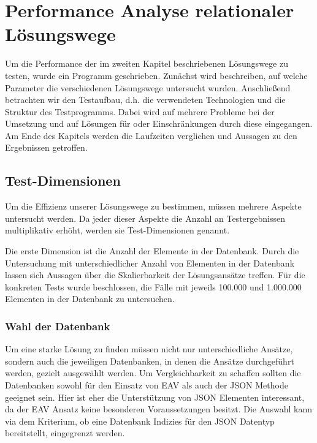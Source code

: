 \chapter{Performance Analyse relationaler Lösungswege}

Um die Performance der im zweiten Kapitel beschriebenen Lösungswege zu testen, wurde ein Programm geschrieben. Zunächst wird beschreiben, auf welche Parameter die verschiedenen Lösungswege untersucht wurden. Anschließend betrachten wir den Testaufbau, d.h. die verwendeten Technologien und die Struktur des Testprogramms. Dabei wird auf mehrere Probleme bei der Umsetzung und auf Lösungen für oder Einschränkungen durch diese eingegangen. Am Ende des Kapitels werden die Laufzeiten verglichen und Aussagen zu den Ergebnissen getroffen.

\section{Test-Dimensionen}

Um die Effizienz unserer Lösungswege zu bestimmen, müssen mehrere Aspekte untersucht werden. Da jeder dieser Aspekte die Anzahl an Testergebnissen multiplikativ erhöht, werden sie Test-Dimensionen genannt.

Die erste Dimension ist die Anzahl der Elemente in der Datenbank. Durch die Untersuchung mit unterschiedlicher Anzahl von Elementen in der Datenbank lassen sich Aussagen über die Skalierbarkeit der Lösungsansätze treffen. Für die konkreten Tests wurde beschlossen, die Fälle mit jeweils 100.000 und 1.000.000 Elementen in der Datenbank zu untersuchen.


\subsection{Wahl der Datenbank}
\label{ssec:database}

Um eine starke Lösung zu finden müssen nicht nur unterschiedliche Ansätze, sondern auch die jeweiligen Datenbanken, in denen die Ansätze durchgeführt werden, gezielt ausgewählt werden. Um Vergleichbarkeit zu schaffen sollten die Datenbanken sowohl für den Einsatz von EAV als auch der JSON Methode geeignet sein. Hier ist eher die Unterstützung von JSON Elementen interessant, da der EAV Ansatz keine besonderen Voraussetzungen besitzt. Die Auswahl kann via dem Kriterium, ob eine Datenbank Indizies für den JSON Datentyp bereitstellt, eingegrenzt werden.


